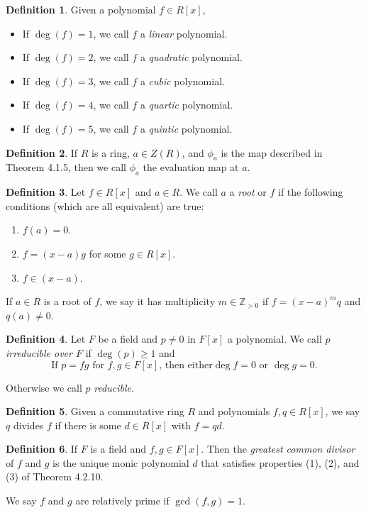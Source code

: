 \documentclass[12pt]{article}
\newcommand{\enumarabic}[1]{
	\begin{enumerate}[label= (\arabic*)]
		#1
	\end{enumerate}
}
\theoremstyle{definition}
\newtheorem*{defn}{Definition}
\newcommand{\Z}{\mathbb{Z}}
\newcommand{\bulletize}[1]{%
	\begin{itemize}
		#1
	\end{itemize}
}
\begin{document}
\begin{defn} Given a polynomial $f\in R[x]$,
	\bulletize{
		\item If $\deg(f)=1$, we call $f$ a \emph{linear} polynomial.
		\item If $\deg(f)=2$, we call $f$ a \emph{quadratic} polynomial.
		\item If $\deg(f)=3$, we call $f$ a \emph{cubic} polynomial.
		\item If $\deg(f)=4$, we call $f$ a \emph{quartic} polynomial.
		\item If $\deg(f)=5$, we call $f$ a \emph{quintic} polynomial.
	}
\end{defn}
\begin{defn}
	If $R$ is a ring, $a\in Z(R)$, and $\phi_a$ is the map described in Theorem 4.1.5, then we call $\phi_a$ the evaluation map at $a$.
\end{defn}
\begin{defn}
	Let $f\in R[x]$ and $a\in R$.  We call $a$ a \emph{root} or $f$ if the following conditions (which are all equivalent) are true:
	\enumarabic{\item $f(a)=0$.\item $f=(x-a)g$ for some $g\in R[x]$.\item $f\in (x-a)$.}
	
	If $a\in R$ is a root of $f$, we say it has multiplicity $m\in \Z_{>0}$ if $f=(x-a)^mq$ and $q(a)\neq 0$.
\end{defn}
\begin{defn}
	Let $F$ be a field and $p\neq 0$ in $F[x]$ a polynomial.  We call $p$ \emph{irreducible over $F$} if $\deg(p)\geq 1$ and
	\[\text{If }p=fg\text{ for }f,g\in F[x]\text{, then either}\deg f=0\text{ or }\deg g=0.\]
	
	Otherwise we call $p$ \emph{reducible}.
\end{defn}
\begin{defn}
	Given a commutative ring $R$ and polynomials $f,q\in R[x]$, we say $q$ divides $f$ if there is some $d\in R[x]$ with $f=qd$.
\end{defn}
\begin{defn}
	If $F$ is a field and $f,g\in F[x]$. Then the \emph{greatest common divisor} of $f$ and $g$ is the unique monic polynomial $d$ that satisfies properties (1), (2), and (3) of Theorem 4.2.10.
	
	We say $f$ and $g$ are relatively prime if $\gcd(f,g)=1$.
\end{defn}
\end{document}
